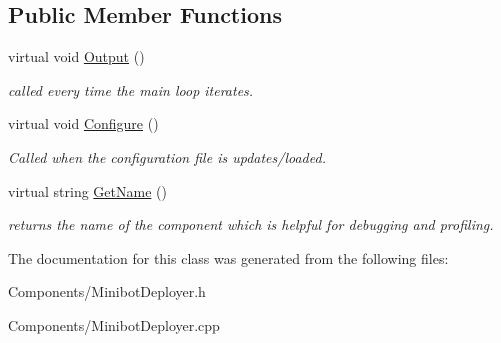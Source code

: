 \subsection*{\-Public \-Member \-Functions}
\begin{DoxyCompactItemize}
\item 
\hypertarget{class_minibot_deployer_a552b0d504c56bcfb4b60a0826eb1c208}{
virtual void \hyperlink{class_minibot_deployer_a552b0d504c56bcfb4b60a0826eb1c208}{\-Output} ()}
\label{class_minibot_deployer_a552b0d504c56bcfb4b60a0826eb1c208}

\begin{DoxyCompactList}\small\item\em called every time the main loop iterates. \end{DoxyCompactList}\item 
\hypertarget{class_minibot_deployer_af41fc04e8c4049b38555db94b39ff2db}{
virtual void \hyperlink{class_minibot_deployer_af41fc04e8c4049b38555db94b39ff2db}{\-Configure} ()}
\label{class_minibot_deployer_af41fc04e8c4049b38555db94b39ff2db}

\begin{DoxyCompactList}\small\item\em \-Called when the configuration file is updates/loaded. \end{DoxyCompactList}\item 
\hypertarget{class_minibot_deployer_a7201dc7490bc3c67994c455e0222c481}{
virtual string \hyperlink{class_minibot_deployer_a7201dc7490bc3c67994c455e0222c481}{\-Get\-Name} ()}
\label{class_minibot_deployer_a7201dc7490bc3c67994c455e0222c481}

\begin{DoxyCompactList}\small\item\em returns the name of the component which is helpful for debugging and profiling. \end{DoxyCompactList}\end{DoxyCompactItemize}


\-The documentation for this class was generated from the following files\-:\begin{DoxyCompactItemize}
\item 
\-Components/\-Minibot\-Deployer.\-h\item 
\-Components/\-Minibot\-Deployer.\-cpp\end{DoxyCompactItemize}
